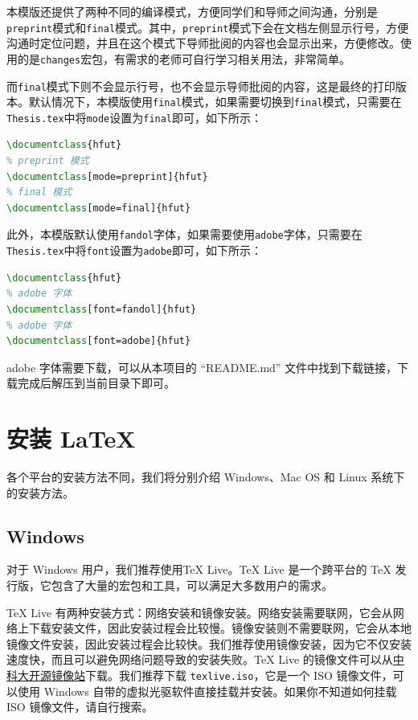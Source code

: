 本模版还提供了两种不同的编译模式，方便同学们和导师之间沟通，分别是\texttt{preprint}模式和\texttt{final}模式。其中，\texttt{preprint}模式下会在文档左侧显示行号，方便沟通时定位问题，并且在这个模式下导师批阅的内容也会显示出来，方便修改。使用的是\texttt{changes}宏包，有需求的老师可自行学习相关用法，非常简单。

而\texttt{final}模式下则不会显示行号，也不会显示导师批阅的内容，这是最终的打印版本。默认情况下，本模版使用\texttt{final}模式，如果需要切换到\texttt{final}模式，只需要在\texttt{Thesis.tex}中将\texttt{mode}设置为\texttt{final}即可，如下所示：

\begin{lstlisting}[language=TeX]
% final 模式
\documentclass{hfut}
% preprint 模式
\documentclass[mode=preprint]{hfut}
% final 模式
\documentclass[mode=final]{hfut}
\end{lstlisting}

此外，本模版默认使用\texttt{fandol}字体，如果需要使用\texttt{adobe}字体，只需要在\texttt{Thesis.tex}中将\texttt{font}设置为\texttt{adobe}即可，如下所示：

\begin{lstlisting}[language=TeX]
% fandol 字体
\documentclass{hfut}
% adobe 字体
\documentclass[font=fandol]{hfut}
% adobe 字体
\documentclass[font=adobe]{hfut}
\end{lstlisting}

adobe 字体需要下载，可以从本项目的 ``README.md'' 文件中找到下载链接，下载完成后解压到当前目录下即可。



\section{安装 LaTeX}

各个平台的安装方法不同，我们将分别介绍 Windows、Mac OS 和 Linux 系统下的安装方法。

\subsection{Windows}

对于 Windows 用户，我们推荐使用TeX Live。TeX Live 是一个跨平台的 TeX 发行版，它包含了大量的宏包和工具，可以满足大多数用户的需求。

TeX Live 有两种安装方式：网络安装和镜像安装。网络安装需要联网，它会从网络上下载安装文件，因此安装过程会比较慢。镜像安装则不需要联网，它会从本地镜像文件安装，因此安装过程会比较快。我们推荐使用镜像安装，因为它不仅安装速度快，而且可以避免网络问题导致的安装失败。TeX Live 的镜像文件可以从\href{https://mirrors.ustc.edu.cn/CTAN/systems/texlive/Images/}{中科大开源镜像站}下载。我们推荐下载 \texttt{texlive.iso}，它是一个 ISO 镜像文件，可以使用 Windows 自带的虚拟光驱软件直接挂载并安装。如果你不知道如何挂载 ISO 镜像文件，请自行搜索。

